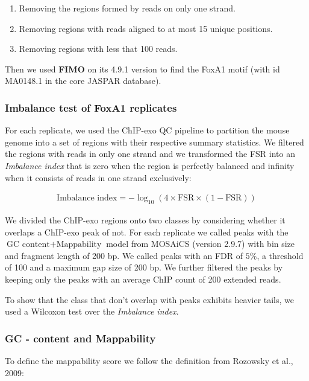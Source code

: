 \documentclass{bmcart}
\begin{document}
\begin{enumerate}
\item Removing the regions formed by reads on only one strand.
\item Removing regions with reads aligned to at most 15 unique
  positions.
\item Removing regions with less that 100 reads.
\end{enumerate}

Then we used \textbf{FIMO} on its 4.9.1 version \cite{fimo} to find
the FoxA1 motif (with id MA0148.1 in the core JASPAR database).

\subsubsection*{Imbalance test of FoxA1 replicates}

For each replicate, we used the ChIP-exo QC pipeline to partition the
mouse genome into a set of regions with their respective summary
statistics. We filtered the regions with reads in only one strand and
we transformed the FSR into an \emph{Imbalance index} that is zero
when the region is perfectly balanced and infinity when it consists of
reads in one strand exclusively:

\begin{align*}
  \mbox{Imbalance index} = -\log_{10} (4 \times \mbox{FSR} \times (1 -
  \mbox{FSR}))
\end{align*}

We divided the ChIP-exo regions onto two classes by considering
whether it overlaps a ChIP-exo peak of not. For each replicate we
called peaks with the $\mbox{GC content} + \mbox{Mappability}$ model
from MOSAiCS \cite{mosaics} (version 2.9.7) with bin size and fragment
length of 200 bp. We called peaks with an FDR of $5\%$, a threshold of
100 and a maximum gap size of 200 bp. We further filtered the peaks by
keeping only the peaks with an average ChIP count of 200 extended
reads.

To show that the class that don't overlap with peaks exhibits heavier
tails, we used a Wilcoxon test over the \emph{Imbalance index}.

\subsubsection*{GC - content and Mappability}

To define the mappability score we follow the definition from Rozowsky
et al., 2009:
\end{document}
